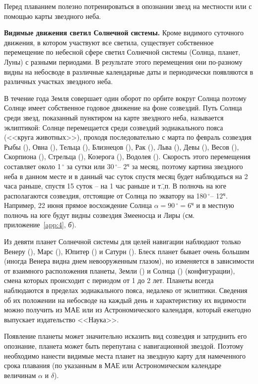 \documentclass[a4paper, 12pt, twoside, final, book, russian, fittopage, cyremdash]{ncc}
\newcommand{\gr}{\ensuremath{\,^\circ}\xspace}
\newcommand{\thr}{\ensuremath{^\text{ч}}\xspace}
\begin{document}
Перед плаванием полезно потренироваться в опознании звезд на местности или с помощью карты звездного неба.

\textbf{Видимые движения светил Солнечной системы.} Кроме видимого суточного движения, в котором участвуют все светила, существует собственное перемещение по небесной сфере светил Солнечной системы (Солнца, планет, Луны) с разными периодами. В результате этого перемещения они по-разному видны на небосводе в различные календарные даты и периодически появляются в различных участках звездного неба.

В течение года Земля совершает один оборот по орбите вокруг Солнца поэтому Солнце имеет собственное годовое движение на фоне созвездий. Путь Солнца среди звезд, показанный пунктиром на карте звездного неба, называется эклиптикой: Солнце перемещается среди созвездий зодиакального пояса (<<круга животных>>), проходя последовательно с марта по февраль созвездия Рыбы (\Pisces), Овна (\Aries), Тельца (\Taurus), Близнецов (\Gemini), Рак (\Cancer), Льва (\Leo), Девы (\Virgo), Весов (\Libra), Скорпиона (\Scorpio), Стрельца (\Sagittarius), Козерога (\Capricorn), Водолея (\Aquarius). Скорость этого перемещения составляет около 1\gr за сутки или 30\gr \--- 2\thr за месяц, поэтому картина звездного неба в данном месте и в данный час суток спустя месяц будет наблюдаться на 2 часа раньше, спустя 15 суток \--- на 1 час раньше и т.\=,п. В полночь на юге располагаются созвездия, отстоящие от Солнца по экватору на 180\gr \--- 12\thr. Например, 22 июня прямое восхождение Солнца $\alpha = 90\gr = 6\thr$ и в местную полночь на юге будут видны созвездия Змееносца и Лиры (см. приложение~\ref{app:4}, \textit{б}).

Из девяти планет Солнечной системы для целей навигации наблюдают только Венеру (\Venus), Марс (\Mars), Юпитер (\Jupiter) и Сатурн (\Saturn). Блеск планет бывает очень большим (иногда Венера видна днем невооруженным глазом), но изменяется в зависимости от взаимного расположения планеты, Земли (\Earth) и Солнца (\Sun) (конфигурации), смена которых происходит с периодом от 1 до 2 лет. Планеты всегда наблюдаются в пределах зодиакального пояса, недалеко от эклиптики. Сведения об их положении на небосводе на каждый день и характеристику их видимости можно получить из МАЕ или из Астрономического календаря, который ежегодно выпускает издательство <<Наука>>.

Появление планеты может значительно исказить вид созвездия и затруднить его опознание, планета может быть перепутана с навигационной звездой. Поэтому необходимо нанести видимые места планет на звездную карту для намеченного срока плавания (по указанным в МАЕ или Астрономическом календаре величинам $\alpha$ и $\delta$).
\end{document}
